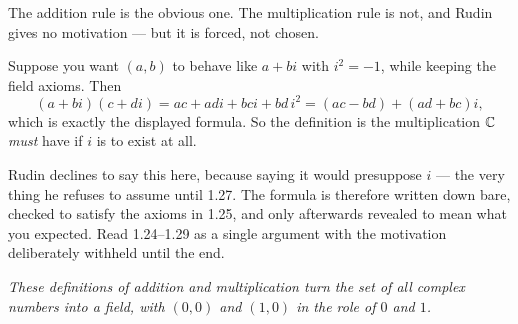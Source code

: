 \begin{unpack}
The addition rule is the obvious one. The multiplication rule is not, and Rudin
gives no motivation --- but it is forced, not chosen.

Suppose you want $(a,b)$ to behave like $a + bi$ with $i^2 = -1$, while keeping
the field axioms. Then
\[ (a+bi)(c+di) = ac + adi + bci + bd\,i^2 = (ac - bd) + (ad+bc)i, \]
which is exactly the displayed formula. So the definition is the multiplication
$\mathbb{C}$ \emph{must} have if $i$ is to exist at all.

Rudin declines to say this here, because saying it would presuppose $i$ --- the
very thing he refuses to assume until 1.27. The formula is therefore written
down bare, checked to satisfy the axioms in 1.25, and only afterwards revealed
to mean what you expected. Read 1.24--1.29 as a single argument with the
motivation deliberately withheld until the end.
\end{unpack}

\emph{These definitions of addition and multiplication turn the set of all
complex numbers into a field, with $(0,0)$ and $(1,0)$ in the role of $0$ and
$1$.}


